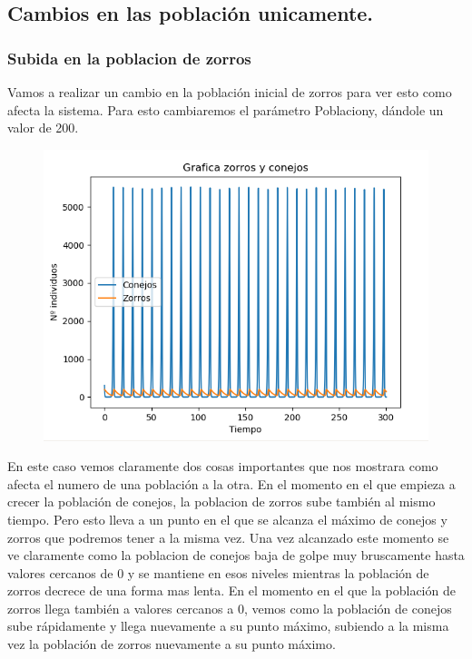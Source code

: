 \documentclass[]{article}
\begin{document}
\subsection{Cambios en las población unicamente.}
\subsubsection{Subida en la poblacion de zorros}
Vamos a realizar un cambio en la población inicial de zorros para ver esto como afecta la sistema.
Para esto cambiaremos el parámetro Poblaciony, dándole un valor de 200. 
\begin{figure}[H]
	\centering
	\includegraphics[width=1\linewidth]{screenshot002}
\end{figure}
En este caso vemos claramente dos cosas importantes que nos mostrara como afecta el numero de una población a la otra. En el momento en el que empieza a crecer la población de conejos, la poblacion de zorros sube también al mismo tiempo. Pero esto lleva a un punto en el que se alcanza el máximo de conejos y zorros que podremos tener a la misma vez. Una vez alcanzado este momento se ve claramente como la poblacion de conejos baja de golpe muy bruscamente hasta valores cercanos de 0 y se mantiene en esos niveles mientras la población de zorros decrece de una forma mas lenta. En el momento en el que la población de zorros llega también a valores cercanos a 0, vemos como la población de conejos sube rápidamente y llega nuevamente a su punto máximo, subiendo a la misma vez la población de zorros nuevamente a su punto máximo.
\newline
\end{document}
